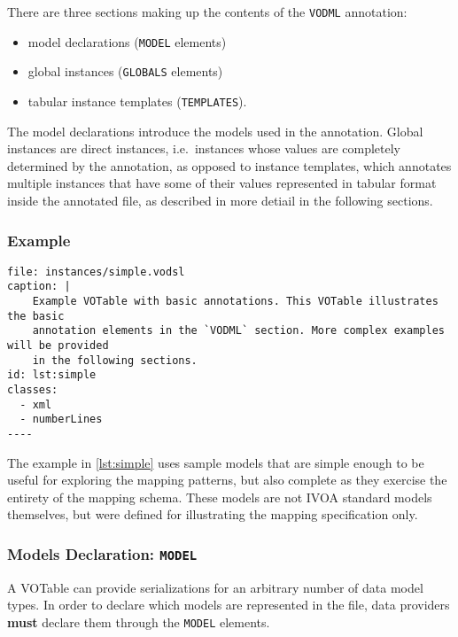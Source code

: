 \documentclass[11pt,a4paper]{ivoa}
\begin{document}
There are three sections making up the contents of the \texttt{VODML}
annotation:

\begin{itemize}
\itemsep1pt\parskip0pt
\item
  model declarations (\texttt{MODEL} elements)
\item
  global instances (\texttt{GLOBALS} elements)
\item
  tabular instance templates (\texttt{TEMPLATES}).
\end{itemize}

The model declarations introduce the models used in the annotation.
Global instances are direct instances, i.e.~instances whose values are
completely determined by the annotation, as opposed to instance
templates, which annotates multiple instances that have some of their
values represented in tabular format inside the annotated file, as
described in more detiail in the following sections.

\subsubsection{Example}\label{example}

\begin{verbatim}
file: instances/simple.vodsl
caption: |
    Example VOTable with basic annotations. This VOTable illustrates the basic
    annotation elements in the `VODML` section. More complex examples will be provided
    in the following sections.
id: lst:simple
classes:
  - xml
  - numberLines
----
\end{verbatim}

The example in \ref{lst:simple} uses sample models that are simple
enough to be useful for exploring the mapping patterns, but also
complete as they exercise the entirety of the mapping schema. These
models are not IVOA standard models themselves, but were defined for
illustrating the mapping specification only.

\subsubsection{Models Declaration: \texttt{MODEL}}\label{sec:norm-model}

A VOTable can provide serializations for an arbitrary number of data
model types. In order to declare which models are represented in the
file, data providers \textbf{must} declare them through the
\texttt{MODEL} elements.
\end{document}
